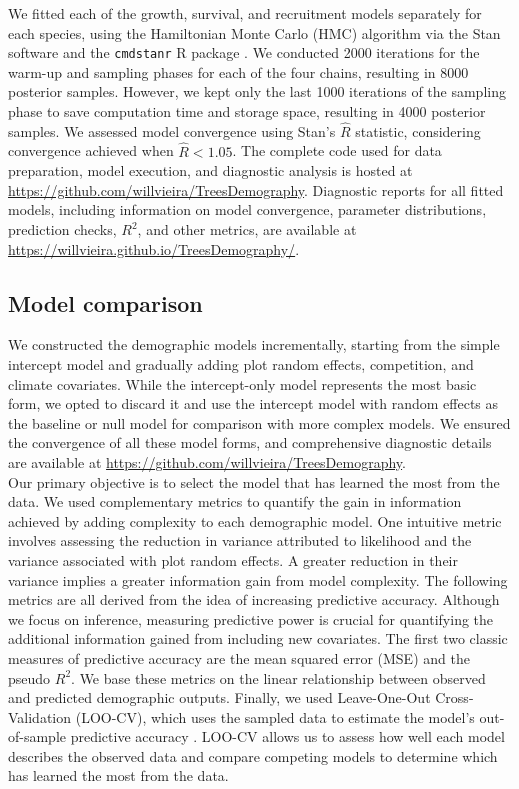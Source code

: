 We fitted each of the growth, survival, and recruitment models
separately for each species, using the Hamiltonian Monte Carlo (HMC)
algorithm via the Stan software \citep[version 2.30.1][]{stan2022stan}
and the \texttt{cmdstanr} R package \citep[version 0.5.3][]{cmdstanr}.
We conducted 2000 iterations for the warm-up and sampling phases for
each of the four chains, resulting in 8000 posterior samples. However,
we kept only the last 1000 iterations of the sampling phase to save
computation time and storage space, resulting in 4000 posterior samples.
We assessed model convergence using Stan's \(\hat{R}\) statistic,
considering convergence achieved when \(\hat{R} < 1.05\). The complete
code used for data preparation, model execution, and diagnostic analysis
is hosted at \url{https://github.com/willvieira/TreesDemography}.
Diagnostic reports for all fitted models, including information on model
convergence, parameter distributions, prediction checks, \(R^2\), and
other metrics, are available at
\url{https://willvieira.github.io/TreesDemography/}.\\

\hypertarget{model-comparison}{%
\subsection{Model comparison}\label{model-comparison}}

We constructed the demographic models incrementally, starting from the
simple intercept model and gradually adding plot random effects,
competition, and climate covariates. While the intercept-only model
represents the most basic form, we opted to discard it and use the
intercept model with random effects as the baseline or null model for
comparison with more complex models. We ensured the convergence of all
these model forms, and comprehensive diagnostic details are available at
\url{https://github.com/willvieira/TreesDemography}.\\

Our primary objective is to select the model that has learned the most
from the data. We used complementary metrics to quantify the gain in
information achieved by adding complexity to each demographic model. One
intuitive metric involves assessing the reduction in variance attributed
to likelihood and the variance associated with plot random effects. A
greater reduction in their variance implies a greater information gain
from model complexity. The following metrics are all derived from the
idea of increasing predictive accuracy. Although we focus on inference,
measuring predictive power is crucial for quantifying the additional
information gained from including new covariates. The first two classic
measures of predictive accuracy are the mean squared error (MSE) and the
pseudo \(R^2\). We base these metrics on the linear relationship between
observed and predicted demographic outputs. Finally, we used
Leave-One-Out Cross-Validation (LOO-CV), which uses the sampled data to
estimate the model's out-of-sample predictive accuracy
\citep{vehtari2017practical}. LOO-CV allows us to assess how well each
model describes the observed data and compare competing models to
determine which has learned the most from the data.\\

